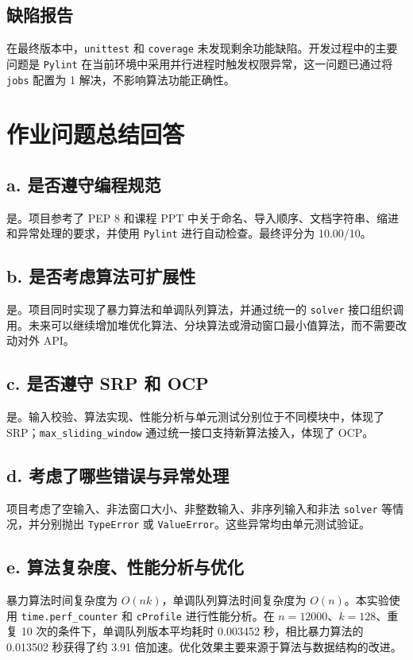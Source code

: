 \documentclass[UTF8,a4paper,12pt]{ctexart}
\begin{document}
\subsection{缺陷报告}
在最终版本中，\texttt{unittest} 和 \texttt{coverage} 未发现剩余功能缺陷。开发过程中的主要问题是 \texttt{Pylint} 在当前环境中采用并行进程时触发权限异常，这一问题已通过将 \texttt{jobs} 配置为 1 解决，不影响算法功能正确性。

\section{作业问题总结回答}
\subsection{a. 是否遵守编程规范}
是。项目参考了 PEP 8 和课程 PPT 中关于命名、导入顺序、文档字符串、缩进和异常处理的要求，并使用 \texttt{Pylint} 进行自动检查。最终评分为 10.00/10。

\subsection{b. 是否考虑算法可扩展性}
是。项目同时实现了暴力算法和单调队列算法，并通过统一的 \texttt{solver} 接口组织调用。未来可以继续增加堆优化算法、分块算法或滑动窗口最小值算法，而不需要改动对外 API。

\subsection{c. 是否遵守 SRP 和 OCP}
是。输入校验、算法实现、性能分析与单元测试分别位于不同模块中，体现了 SRP；\texttt{max\_sliding\_window} 通过统一接口支持新算法接入，体现了 OCP。

\subsection{d. 考虑了哪些错误与异常处理}
项目考虑了空输入、非法窗口大小、非整数输入、非序列输入和非法 \texttt{solver} 等情况，并分别抛出 \texttt{TypeError} 或 \texttt{ValueError}。这些异常均由单元测试验证。

\subsection{e. 算法复杂度、性能分析与优化}
暴力算法时间复杂度为 \(O(nk)\)，单调队列算法时间复杂度为 \(O(n)\)。本实验使用 \texttt{time.perf\_counter} 和 \texttt{cProfile} 进行性能分析。在 \(n=12000\)、\(k=128\)、重复 10 次的条件下，单调队列版本平均耗时 0.003452 秒，相比暴力算法的 0.013502 秒获得了约 3.91 倍加速。优化效果主要来源于算法与数据结构的改进。
\end{document}
